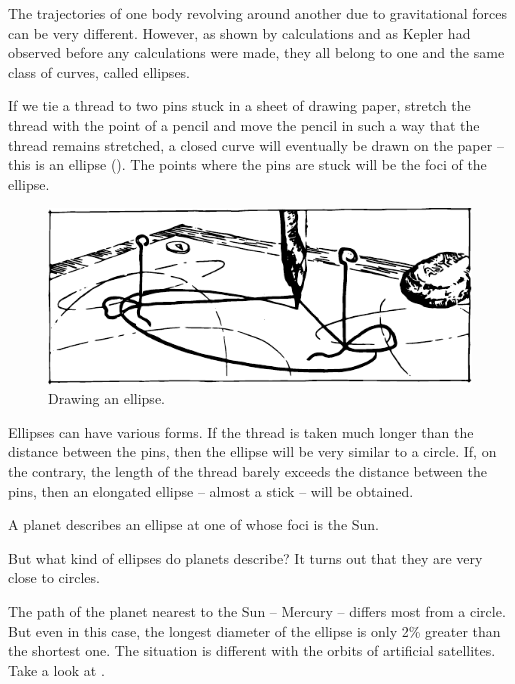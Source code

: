 The trajectories of one body revolving around another
due to gravitational forces can be very different. However,
as shown by calculations and as Kepler had observed
before any calculations were made, they all belong to
one and the same class of curves, called ellipses.

If we tie a thread to two pins stuck in a sheet of drawing paper, stretch the thread with the point of a pencil
and move the pencil in such a way that the thread remains
stretched, a closed curve will eventually be drawn on
the paper -- this is an ellipse (). The points
where the pins are stuck will be the foci of the ellipse.

 \begin{figure}[!ht]
 \centering
 \includegraphics[width=\textwidth]{figures/fig-6-5.pdf}
 \caption{Drawing an ellipse.}
 \label{fig-6-5}
 \end{figure}


Ellipses can have various forms. If the thread is taken
much longer than the distance between the pins, then
the ellipse will be very similar to a circle. If, on the
contrary, the length of the thread barely exceeds the distance between the pins, then an elongated ellipse
-- almost a stick -- will be obtained.

A planet describes an ellipse at one of whose foci is
the Sun.

But what kind of ellipses do planets describe? It turns
out that they are very close to circles.

The path of the planet nearest to the Sun -- Mercury --
differs most from a circle. But even in this case, the
longest diameter of the ellipse is only 2\% greater than
the shortest one. The situation is different with the
orbits of artificial satellites. Take a look at .

